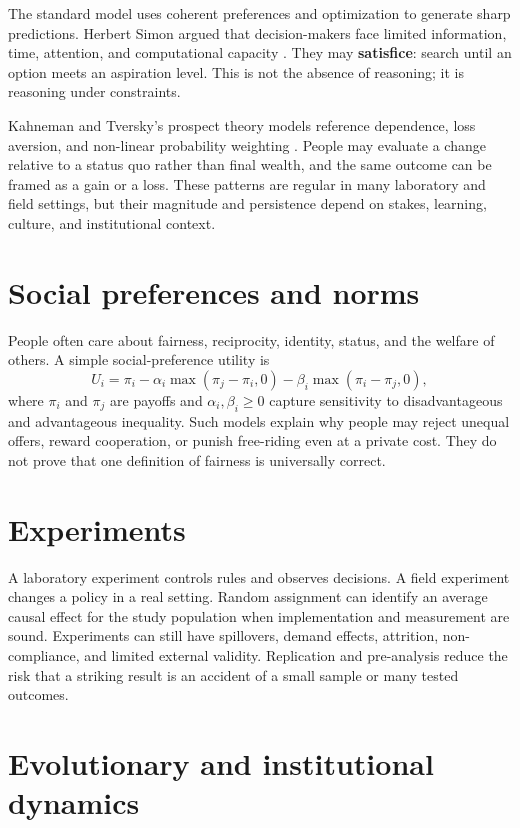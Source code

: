 \documentclass[11pt,oneside,openany]{book}
\newcommand{\term}[1]{\textbf{#1}\index{#1}}
\begin{document}
The standard model uses coherent preferences and optimization to generate sharp predictions. Herbert Simon argued that decision-makers face limited information, time, attention, and computational capacity \cite{simon1955}. They may \term{satisfice}: search until an option meets an aspiration level. This is not the absence of reasoning; it is reasoning under constraints.

Kahneman and Tversky's prospect theory models reference dependence, loss aversion, and non-linear probability weighting \cite{kahn1979}. People may evaluate a change relative to a status quo rather than final wealth, and the same outcome can be framed as a gain or a loss. These patterns are regular in many laboratory and field settings, but their magnitude and persistence depend on stakes, learning, culture, and institutional context.

\section{Social preferences and norms}

People often care about fairness, reciprocity, identity, status, and the welfare of others. A simple social-preference utility is
\[
  U_i=\pi_i-\alpha_i\max(\pi_j-\pi_i,0)-\beta_i\max(\pi_i-\pi_j,0),
\]
where $\pi_i$ and $\pi_j$ are payoffs and $\alpha_i,\beta_i\geq0$ capture sensitivity to disadvantageous and advantageous inequality. Such models explain why people may reject unequal offers, reward cooperation, or punish free-riding even at a private cost. They do not prove that one definition of fairness is universally correct.

\section{Experiments}

A laboratory experiment controls rules and observes decisions. A field experiment changes a policy in a real setting. Random assignment can identify an average causal effect for the study population when implementation and measurement are sound. Experiments can still have spillovers, demand effects, attrition, non-compliance, and limited external validity. Replication and pre-analysis reduce the risk that a striking result is an accident of a small sample or many tested outcomes.

\section{Evolutionary and institutional dynamics}
\end{document}

